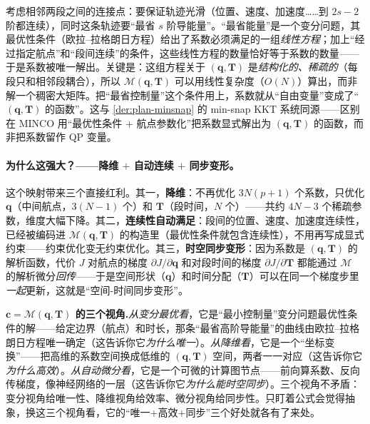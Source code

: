 \begin{derivation}[为什么 $\mathbf c=\mathcal M(\mathbf q,\mathbf T)$ 成立]\label{der:st-minco}
考虑相邻两段之间的连接点：要保证轨迹光滑（位置、速度、加速度……到 $2s-2$ 阶都连续），同时这条轨迹要“最省 $s$ 阶导能量”。“最省能量”是一个变分问题，其最优性条件（欧拉--拉格朗日方程）给出了系数必须满足的一组\emph{线性方程}；加上“经过指定航点”和“段间连续”的条件，这些线性方程的数量恰好等于系数的数量——于是系数被唯一解出。关键是：这组方程关于 $(\mathbf q,\mathbf T)$ 是\emph{结构化的、稀疏的}（每段只和相邻段耦合），所以 $\mathcal M(\mathbf q,\mathbf T)$ 可以用线性复杂度（$O(N)$）算出，而非解一个稠密大矩阵\cite{wang2022minco}。把“最省控制量”这个条件用上，系数就从“自由变量”变成了“$(\mathbf q,\mathbf T)$ 的函数”。这与 \cref{der:plan-minsnap} 的 min-snap KKT 系统同源——区别在 MINCO 用“最优性条件 + 航点参数化”把系数显式解出为 $(\mathbf q,\mathbf T)$ 的函数，而非把系数留作 QP 变量。
\end{derivation}

\paragraph{为什么这强大？——降维 $+$ 自动连续 $+$ 同步变形。}
这个映射带来三个直接红利。其一，\textbf{降维}：不再优化 $3N(p+1)$ 个系数，只优化 $\mathbf q$（中间航点，$3(N-1)$ 个）和 $\mathbf T$（段时间，$N$ 个）——共约 $4N-3$ 个稀疏参数，维度大幅下降。其二，\textbf{连续性自动满足}：段间的位置、速度、加速度连续性，已经被编码进 $\mathcal M(\mathbf q,\mathbf T)$ 的构造里（最优性条件就包含连续性），不用再写成显式约束——约束优化变无约束优化。其三，\textbf{时空同步变形}：因为系数是 $(\mathbf q,\mathbf T)$ 的解析函数，代价 $J$ 对航点的梯度 $\partial J/\partial\mathbf q$ 和对段时间的梯度 $\partial J/\partial\mathbf T$ 都能通过 $\mathcal M$ 的解析微分\emph{回传}——于是空间形状（$\mathbf q$）和时间分配（$\mathbf T$）可以在同一个梯度步里\emph{一起}更新，这就是“空间-时间同步变形”。

\begin{insight}
\textbf{$\mathbf c=\mathcal M(\mathbf q,\mathbf T)$ 的三个视角.}\;\emph{从变分最优看}，它是“最小控制量”变分问题最优性条件的解——给定边界（航点）和时长，那条“最省高阶导能量”的曲线由欧拉--拉格朗日方程唯一确定（这告诉你它\emph{为什么唯一}）。\emph{从降维看}，它是一个“坐标变换”——把高维的系数空间换成低维的 $(\mathbf q,\mathbf T)$ 空间，两者一一对应（这告诉你它\emph{为什么高效}）。\emph{从自动微分看}，它是一个可微的计算图节点——前向算系数、反向传梯度，像神经网络的一层（这告诉你它\emph{为什么能时空同步}）。三个视角不矛盾：变分视角给唯一性、降维视角给效率、微分视角给同步性。只盯着公式会觉得抽象，换这三个视角看，它的“唯一+高效+同步”三个好处就各有了来处。
\end{insight}

